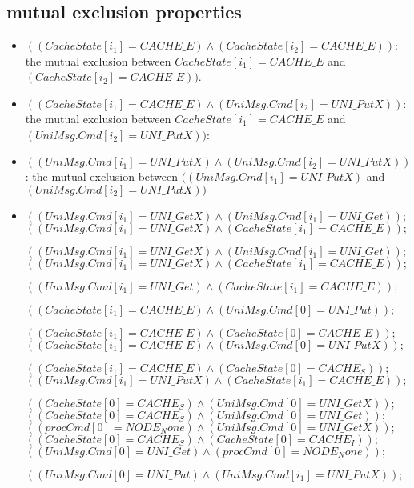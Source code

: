 \documentclass{llncs}
\begin{document}
\subsection{mutual exclusion properties}
\begin{itemize}
\item $ ( ( CacheState[i_1]=CACHE\_E)  \wedge ( CacheState[i_2]=CACHE\_E)  ) $: the mutual exclusion between
$CacheState[i_1]=CACHE\_E$ and $( CacheState[i_2]=CACHE\_E)  )$.
\item
$( ( CacheState[i_1]=CACHE\_E)  \wedge ( UniMsg.Cmd[i_2]=UNI\_PutX)  ):$the mutual exclusion between
$CacheState[i_1]=CACHE\_E$ and $ ( UniMsg.Cmd[i_2]=UNI\_PutX))$:



\item
$( ( UniMsg.Cmd[i_1]=UNI\_PutX)  \wedge ( UniMsg.Cmd[i_2]=UNI\_PutX)  ) $: the mutual exclusion between
  $( ( UniMsg.Cmd[i_1]=UNI\_PutX)$ and  $( UniMsg.Cmd[i_2]=UNI\_PutX)  ) $


  \item
$( ( UniMsg.Cmd[i_1]=UNI\_GetX)  \wedge ( UniMsg.Cmd[i_1]=UNI\_Get)  ) ;$
$( ( UniMsg.Cmd[i_1]=UNI\_GetX)  \wedge ( CacheState[i_1]=CACHE\_E)  ) ;$

$( ( UniMsg.Cmd[i_1]=UNI\_GetX)  \wedge ( UniMsg.Cmd[i_1]=UNI\_Get)  ) ;$
$( ( UniMsg.Cmd[i_1]=UNI\_GetX)  \wedge ( CacheState[i_1]=CACHE\_E)  ) ;$

$( ( UniMsg.Cmd[i_1]=UNI\_Get)  \wedge ( CacheState[i_1]=CACHE\_E)  ) ;$

$( ( CacheState[i_1]=CACHE\_E)  \wedge ( UniMsg.Cmd[0]=UNI\_Put)  ) ;$


$( ( CacheState[i_1]=CACHE\_E)  \wedge ( CacheState[0]=CACHE\_E)  ) ;$
$( ( CacheState[i_1]=CACHE\_E)  \wedge ( UniMsg.Cmd[0]=UNI\_PutX)  ) ;$


$( ( CacheState[i_1]=CACHE\_E)  \wedge ( CacheState[0]=CACHE_S)  ) ;$
$( ( UniMsg.Cmd[i_1]=UNI\_PutX)  \wedge ( CacheState[i_1]=CACHE\_E)  ) ;$

$( ( CacheState[0]=CACHE_S)  \wedge ( UniMsg.Cmd[0]=UNI\_GetX)  ) ;$
$( ( CacheState[0]=CACHE_S)  \wedge ( UniMsg.Cmd[0]=UNI\_Get)  ) ;$
$( ( procCmd[0]=NODE_None)  \wedge ( UniMsg.Cmd[0]=UNI\_GetX)  ) ;$
$( ( CacheState[0]=CACHE_S)  \wedge ( CacheState[0]=CACHE_I)  ) ;$
$( ( UniMsg.Cmd[0]=UNI\_Get)  \wedge ( procCmd[0]=NODE_None)  ) ;$

$( ( UniMsg.Cmd[0]=UNI\_Put)  \wedge ( UniMsg.Cmd[i_1]=UNI\_PutX)  ) ;$

\end{itemize}
\end{document}

